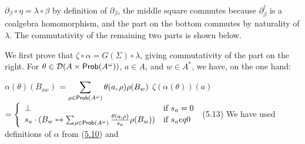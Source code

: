 \hypertarget{html:S5.SS0.SSS0.Px2.SPx1.p3.m5}{}\({\partial_{\beta}\circ\eta=\lambda\circ\beta}\) by definition of %
\hypertarget{html:S5.SS0.SSS0.Px2.SPx1.p3.m6}{}\({\partial_{\beta}}\), the middle square commutes because %
\hypertarget{html:S5.SS0.SSS0.Px2.SPx1.p3.m7}{}\({\partial_{\beta}^{\dagger}}\) is a coalgebra homomorphism, and the part on the bottom commutes by naturality of %
\hypertarget{html:S5.SS0.SSS0.Px2.SPx1.p3.m8}{}\({\lambda}\). The commutativity of the remaining two parts is shown below.
\par\medskip
\hypertarget{html:S5.SS0.SSS0.Px2.SPx1.p4}{} We first prove that %
\hypertarget{html:S5.SS0.SSS0.Px2.SPx1.p4.m1}{}\({\zeta\circ\alpha=G(\Sigma)\circ\lambda}\), giving commutativity of the part on the right. For %
\hypertarget{html:S5.SS0.SSS0.Px2.SPx1.p4.m2}{}\({\theta\in{\mathcal{D}}(A\times\text{\sf Prob}(A^{\omega}))}\), %
\hypertarget{html:S5.SS0.SSS0.Px2.SPx1.p4.m3}{}\({a\in A}\), and %
\hypertarget{html:S5.SS0.SSS0.Px2.SPx1.p4.m4}{}\({w\in A^{*}}\), we have, on the one hand:
\par\medskip
\hypertarget{html:S8.EGx8}{} %
\hypertarget{html:S5.Ex7}{}  %
\hypertarget{html:S5.Ex7.m1}{}\({\displaystyle\alpha(\theta)(B_{aw})}\) %
\hypertarget{html:S5.Ex7.m2}{}\({\displaystyle=\sum_{\rho\in\text{\sf Prob}(A^{\omega})}\theta(a,\rho)\rho(B_{w})}\)   %
\hypertarget{html:S5.E13}{}  %
\hypertarget{html:S5.E13.m1}{}\({\displaystyle\zeta(\alpha(\theta))(a)}\) %
\hypertarget{html:S5.E13.m2}{}\({\displaystyle=\left\{\begin{array}[]{ll}\bot&\mbox{if $s_{a}=0$}\\
s_{a}\cdot(B_{w}\mapsto\sum_{\rho\in\text{\sf Prob}(A^{\omega})}\frac{\theta(a,\rho)}{s_{a}}\rho(B_{w}))&\mbox{if $s_{a}
eq 0$}\end{array}\right.}\)  (5.13)   We have used definitions of %
\hypertarget{html:S5.SS0.SSS0.Px2.SPx1.p4.m5}{}\({\alpha}\) from (\hyperlink{html:S5.E10}{5.10}) and %
